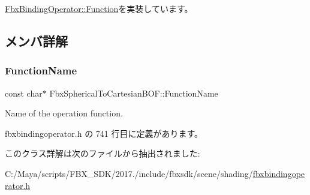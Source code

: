 \hyperlink{class_fbx_binding_operator_1_1_function_a9bbeec993a6e453a6569e7f40a85fd52}{Fbx\+Binding\+Operator\+::\+Function}を実装しています。



\subsection{メンバ詳解}
\mbox{\label{class_fbx_spherical_to_cartesian_b_o_f_a17f65fd82d7c31f9233ea2871cc732ad}} 
\subsubsection{\texorpdfstring{Function\+Name}{FunctionName}}
{\footnotesize\ttfamily const char$\ast$ Fbx\+Spherical\+To\+Cartesian\+B\+O\+F\+::\+Function\+Name\hspace{0.3cm}{\ttfamily [static]}}



Name of the operation function. 



 fbxbindingoperator.\+h の 741 行目に定義があります。



このクラス詳解は次のファイルから抽出されました\+:\begin{DoxyCompactItemize}
\item 
C\+:/\+Maya/scripts/\+F\+B\+X\+\_\+\+S\+D\+K/2017./include/fbxsdk/scene/shading/\hyperlink{fbxbindingoperator_8h}{fbxbindingoperator.\+h}\end{DoxyCompactItemize}
